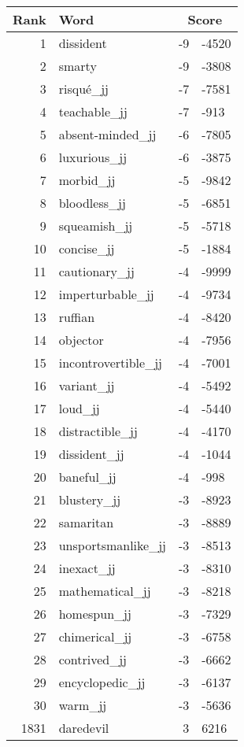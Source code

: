 \begin{longtable}[!htbp]{| rlr@{.}l |}
    \hline
    \textbf{Rank} & \textbf{Word} & \multicolumn{2}{c|}{\textbf{Score}} \\
    \hline
    \endhead
    1 & dissident & -9 & -4520 \\
    2 & smarty & -9 & -3808 \\
    3 & risqué\_jj & -7 & -7581 \\
    4 & teachable\_jj & -7 & -913 \\
    5 & absent-minded\_jj & -6 & -7805 \\
    6 & luxurious\_jj & -6 & -3875 \\
    7 & morbid\_jj & -5 & -9842 \\
    8 & bloodless\_jj & -5 & -6851 \\
    9 & squeamish\_jj & -5 & -5718 \\
    10 & concise\_jj & -5 & -1884 \\
    11 & cautionary\_jj & -4 & -9999 \\
    12 & imperturbable\_jj & -4 & -9734 \\
    13 & ruffian & -4 & -8420 \\
    14 & objector & -4 & -7956 \\
    15 & incontrovertible\_jj & -4 & -7001 \\
    16 & variant\_jj & -4 & -5492 \\
    17 & loud\_jj & -4 & -5440 \\
    18 & distractible\_jj & -4 & -4170 \\
    19 & dissident\_jj & -4 & -1044 \\
    20 & baneful\_jj & -4 & -998 \\
    21 & blustery\_jj & -3 & -8923 \\
    22 & samaritan & -3 & -8889 \\
    23 & unsportsmanlike\_jj & -3 & -8513 \\
    24 & inexact\_jj & -3 & -8310 \\
    25 & mathematical\_jj & -3 & -8218 \\
    26 & homespun\_jj & -3 & -7329 \\
    27 & chimerical\_jj & -3 & -6758 \\
    28 & contrived\_jj & -3 & -6662 \\
    29 & encyclopedic\_jj & -3 & -6137 \\
    30 & warm\_jj & -3 & -5636 \\
    1831 & daredevil & 3 & 6216 \\

\end{longtable}
